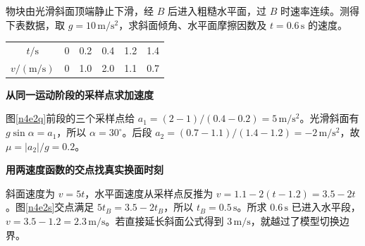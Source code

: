 \begin{question}\begin{example}[采样速度与换面时刻]\label{n4e2}
物块由光滑斜面顶端静止下滑，经 $B$ 后进入粗糙水平面，过 $B$ 时速率连续。测得下表数据，取 $g=10\,\mathrm{m/s^2}$，求斜面倾角、水平面摩擦因数及 $t=0.6\,\mathrm s$ 的速度。
\begin{center}\begin{tabular}{c|rrrrr}\toprule
$t/\mathrm s$&0&0.2&0.4&1.2&1.4\\
$v/(\mathrm{m/s})$&0&1.0&2.0&1.1&0.7\\\bottomrule
\end{tabular}\end{center}
\end{example}\end{question}
\begin{solution}\textbf{从同一运动阶段的采样点求加速度}\par\nobreak
图\ref{n4e2q}前段的三个采样点给 $a_1=(2-1)/(0.4-0.2)=5\,\mathrm{m/s^2}$。光滑斜面有 $g\sin\alpha=a_1$，所以 $\alpha=30^\circ$。后段 $a_2=(0.7-1.1)/(1.4-1.2)=-2\,\mathrm{m/s^2}$，故 $\mu=|a_2|/g=0.2$。


\par\medskip{}\noindent\textbf{用两速度函数的交点找真实换面时刻}\par\nobreak
斜面速度为 $v=5t$，水平面速度从采样点反推为 $v=1.1-2(t-1.2)=3.5-2t$。图\ref{n4e2s}交点满足 $5t_B=3.5-2t_B$，所以 $t_B=0.5\,\mathrm s$。所求 $0.6\,\mathrm s$ 已进入水平段，$v=3.5-1.2=2.3\,\mathrm{m/s}$。若直接延长斜面公式得到 $3\,\mathrm{m/s}$，就越过了模型切换边界。
\end{solution}

